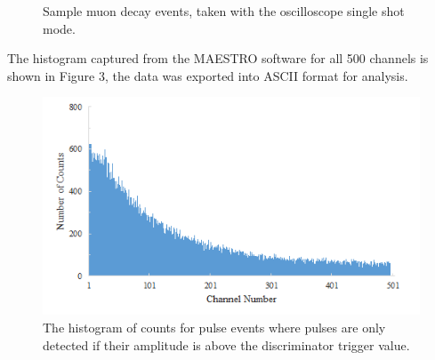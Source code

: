 \documentclass[%
 aip,
 amsmath,amssymb,
 reprint,%
floatfix,
]{revtex4-1}
\begin{document}
\begin{figure}[H]
	\centering
	\hfill
	\hfill
	\caption{Sample muon decay events, taken with the oscilloscope single shot mode.}
\end{figure}

The histogram captured from the MAESTRO software for all 500 channels is shown in Figure 3, the data was exported into ASCII format for analysis.

\begin{figure}[H]
	\centering
	\includegraphics[scale=0.8]{unfiltered.png}
	\caption{The histogram of counts for pulse events where pulses are only detected if their amplitude is above the discriminator trigger value.}
\end{figure}
\end{document}
